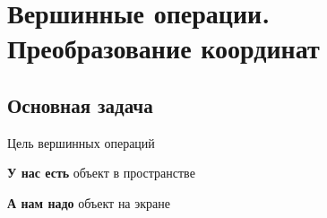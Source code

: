 \documentclass[10pt]{beamer}
\begin{document}
	
	\section{Вершинные операции. Преобразование координат  }
	
	\frame{\sectionpage}
	
	
	\subsection{Основная задача}
	
	\begin{frame}{Цель вершинных операций}
		{
			\centering
			\textbf{У нас есть} объект в пространстве
			
		}
		{
			\centering
			\textbf{А нам надо} объект на экране
			
		}
	\end{frame}
	
\end{document}
